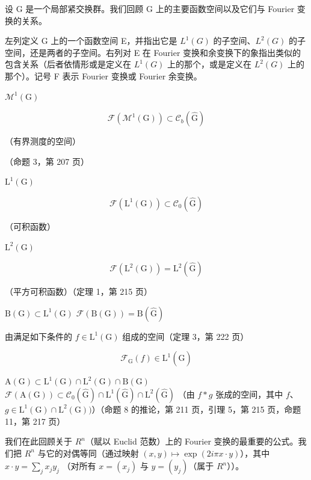 \backmatter
{}


设 G 是一个局部紧交换群。我们回顾 G 上的主要函数空间以及它们与 Fourier 变换的关系。

左列定义 G 上的一个函数空间 E，并指出它是 \(L^{1}(G)\) 的子空间、\(L^{2}(G)\) 的子空间，还是两者的子空间。右列对 E 在 Fourier 变换和余变换下的象指出类似的包含关系（后者依情形或是定义在 \(L^{1}(G)\) 上的那个，或是定义在 \(L^{2}(G)\) 上的那个）。记号 F 表示 Fourier 变换或 Fourier 余变换。

\(\mathcal{M}^1 (\mathrm{G})\)

\[
\mathcal {F} (\mathcal {M} ^ {1} (\mathrm{G})) \subset \mathcal {C} _ {b} (\widehat {\mathrm{G}})
\]

（有界测度的空间）

（命题 3，第 207 页）

\(\mathrm{L}^{1}(\mathrm{G})\)

\[
\mathcal {F} (\mathrm{L} ^ {1} (\mathrm{G})) \subset \mathcal {C} _ {0} (\widehat {\mathrm{G}})
\]

（可积函数）

\(\mathrm{L}^2 (\mathrm{G})\)

\[
\mathscr {F} (\mathrm{L} ^ {2} (\mathrm{G})) = \mathrm{L} ^ {2} (\widehat {\mathrm{G}})
\]

（平方可积函数）（定理 1，第 215 页）

\(\mathrm{B(G)}\subset \mathrm{L}^{1}(\mathrm{G})\) \(\mathcal{F}(\mathrm{B(G)}) = \mathrm{B}(\widehat{\mathrm{G}})\)

由满足如下条件的 \(f \in \mathrm{L}^1(\mathrm{G})\) 组成的空间（定理 3，第 222 页）

\[
\mathcal {F} _ {\mathrm{G}} (f) \in \mathrm{L} ^ {1} (\widehat {\mathrm{G}})
\]

\(\mathrm{A(G)}\subset \mathrm{L}^1 (\mathrm{G})\cap \mathrm{L}^2 (\mathrm{G})\cap \mathrm{B(G)}\) \(\mathcal{F}(\mathrm{A(G)})\subset \mathcal{C}_0(\widehat{\mathrm{G}})\cap \mathrm{L}^1 (\widehat{\mathrm{G}})\cap \mathrm{L}^2 (\widehat{\mathrm{G}})\) （由 \(f*g\) 张成的空间，其中 \(f\)、\(g\in \mathrm{L}^{1}(\mathrm{G})\cap \mathrm{L}^{2}(\mathrm{G}))\)）（命题 8 的推论，第 211 页，引理 5，第 215 页，命题 11，第 217 页）


我们在此回顾关于 \(R^{n}\)（赋以 Euclid 范数）上的 Fourier 变换的最重要的公式。我们把 \(R^{n}\) 与它的对偶等同（通过映射 \((x,y)\mapsto\exp(2i\pi x\cdot y)\)），其中 \(x\cdot y=\sum_{j}x_{j}y_{j}\) （对所有 \(x=(x_{j})\) 与 \(y=(y_{j})\)（属于 \(R^{n}\)））。

